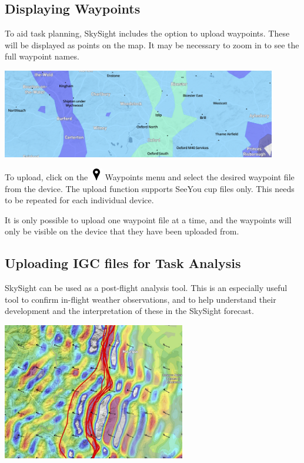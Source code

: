\documentclass[11pt,a4paper]{article}
\begin{document}
\subsection{Displaying Waypoints}
To aid task planning, SkySight includes the option to upload waypoints. These will be displayed as points on the map.  It may be necessary to zoom in to see the full waypoint names.
\begin{center}
\includegraphics[width=12cm]{images/waypoint.png}
\end{center}
To upload, click on the \includegraphics[height=15pt]{images/icons/waypoint.png} Waypoints menu and select the desired waypoint file from the device. The upload function supports SeeYou cup files only. This needs to be repeated for each individual device.

It is only possible to upload one waypoint file at a time, and the waypoints will only be visible on the device that they have been uploaded from.
\subsection{Uploading IGC files for Task Analysis}
SkySight can be used as a post-flight analysis tool. This is an especially useful tool to confirm in-flight weather observations, and to help understand their development and the interpretation of these in the SkySight forecast.

\begin{center}
\includegraphics[width=8cm]{images/igc_upload.png}
\end{center}
\end{document}
